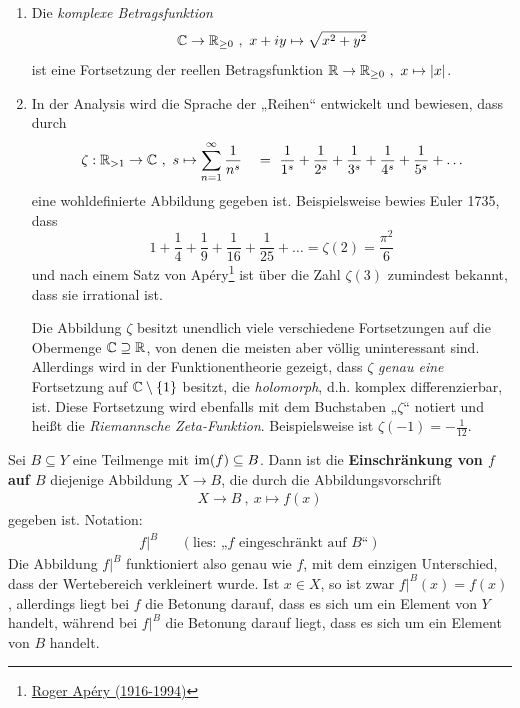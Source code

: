 \begin{bsp} \quad
    \begin{enumerate}
        \item Die \emph{komplexe Betragsfunktion}
            \[ \mathbb C \to \mathbb R_{\ge 0} \ ,\ x+iy \mapsto \sqrt{x^2+y^2} \]
        ist eine Fortsetzung der reellen Betragsfunktion $\mathbb R\to \mathbb R_{\ge 0} \ ,\ x\mapsto \vert x\vert$.
        \item In der Analysis wird die Sprache der „Reihen“ entwickelt und bewiesen, dass durch
            \[ \zeta : \mathbb R_{>1} \to \mathbb C \ ,\ s \mapsto \sum_{n=1}^\infty \frac{1}{n^s} \quad =\  \frac{1}{1^s} + \frac{1}{2^s} + \frac{1}{3^s} + \frac{1}{4^s} + \frac{1}{5^s} + \ldots\]
        eine wohldefinierte Abbildung gegeben ist. Beispielsweise bewies Euler 1735, dass
            \[ 1 + \frac{1}{4} + \frac{1}{9} + \frac{1}{16} + \frac{1}{25} + \ldots = \zeta(2) = \frac{\pi^2}{6} \]
        und nach einem Satz von Apéry\footnote{\href{https://de.wikipedia.org/wiki/Roger Apery}{Roger Apéry (1916-1994)}} ist über die Zahl $\zeta(3)$ zumindest bekannt, dass sie irrational ist.

        Die Abbildung $\zeta$ besitzt unendlich viele verschiedene Fortsetzungen auf die Obermenge $\mathbb C \supseteq \mathbb R$, von denen die meisten aber völlig uninteressant sind. Allerdings wird in der Funktionentheorie gezeigt, dass $\zeta$ \emph{genau eine} Fortsetzung auf $\mathbb C\setminus \{1\}$ besitzt, die \emph{holomorph}, d.h. komplex differenzierbar, ist. Diese Fortsetzung wird ebenfalls mit dem Buchstaben „$\zeta$“ notiert und heißt die \emph{Riemannsche Zeta-Funktion}. Beispielsweise ist $\zeta(-1)=-\frac{1}{12}$.
    \end{enumerate}
\end{bsp}


\begin{de}\label{def:zielschrank}
    Sei $B\subseteq Y$ eine Teilmenge mit $\operatorname{im}(f) \subseteq B$. Dann ist die \textbf{Einschränkung von $f$ auf $B$} diejenige Abbildung $X \to B$, die durch die Abbildungsvorschrift
    \begin{align*}
        X \to B \ ,\ x \mapsto f(x)
    \end{align*}
    gegeben ist. Notation:
    \begin{align*}
        f\vert^B && (\text{lies: „$f$ eingeschränkt auf $B$“})
    \end{align*}
    Die Abbildung $f\vert^B$ funktioniert also genau wie $f$, mit dem einzigen Unterschied, dass der Wertebereich verkleinert wurde. Ist $x\in X$, so ist zwar $f\vert^B(x) = f(x)$, allerdings liegt bei $f$ die Betonung darauf, dass es sich um ein Element von $Y$ handelt, während bei $f\vert^{B}$ die Betonung darauf liegt, dass es sich um ein Element von $B$ handelt.
\end{de}


